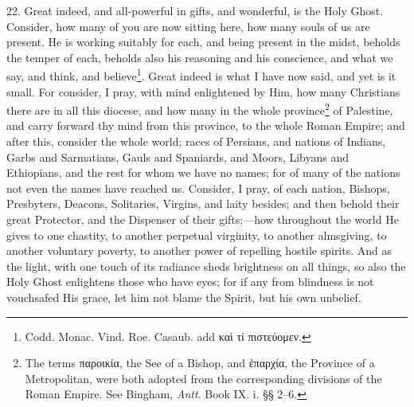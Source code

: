 22. Great indeed, and all-powerful in gifts, and wonderful, is the Holy Ghost. Consider, how many of you are now sitting here, how many souls of us are present. He is working suitably for each, and being present in the midst, beholds the temper of each, beholds also his reasoning and his conscience, and what we say, and think, and believe\footnote{Codd. Monac. Vind. Roe. Casaub. add \textgreek{καὶ τί πιστεύομεν}.}. Great indeed is what I have now said, and yet is it small. For consider, I pray, with mind enlightened by Him, how many Christians there are in all this diocese, and how many in the whole province\footnote{The terms \textgreek{παροικία}, the See of a Bishop, and \textgreek{ἐπαρχία}, the Province of a Metropolitan, were both adopted from the corresponding divisions of the Roman Empire. See Bingham, \emph{Antt}. Book IX. i. §§ 2–6.} of Palestine, and carry forward thy mind from this province, to the whole Roman Empire; and after this, consider the whole world; races of Persians, and nations of Indians, Garbs and Sarmatians, Gauls and Spaniards, and Moors, Libyans and Ethiopians, and the rest for whom we have no names; for of many of the nations not even the names have reached us. Consider, I pray, of each nation, Bishops, Presbyters, Deacons, Solitaries, Virgins, and laity besides; and then behold their great Protector, and the Dispenser of their gifts;—how throughout the world He gives to one chastity, to another perpetual virginity, to another almsgiving, to another voluntary poverty, to another power of repelling hostile spirits. And as the light, with one touch of its radiance sheds brightness on all things, so also the Holy Ghost enlightens those who have eyes; for if any from blindness is not vouchsafed His grace, let him not blame the Spirit, but his own unbelief.

